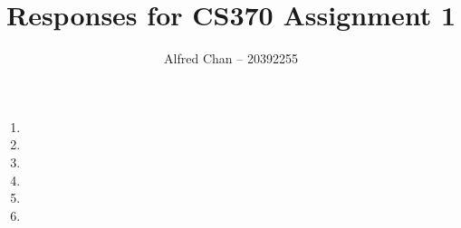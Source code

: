 \documentclass[12pt]{article}
\title{Responses for CS370 Assignment 1}
\author{Alfred Chan -- 20392255}
\begin{document}


\begin{enumerate}
\item
\item
\item
\item
\item
\item

\end{enumerate}
\end{document}
